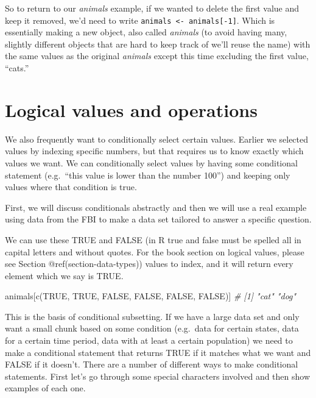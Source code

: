 \documentclass[
  a4paper,
]{krantz}
\makeatletter
\newenvironment{Shaded}{\begin{snugshade}}{\end{snugshade}}
\newcommand{\CommentTok}[1]{\textcolor[rgb]{0.56,0.35,0.01}{\textit{#1}}}
\newcommand{\ConstantTok}[1]{\textcolor[rgb]{0.00,0.00,0.00}{#1}}
\newcommand{\FunctionTok}[1]{\textcolor[rgb]{0.00,0.00,0.00}{#1}}
\newcommand{\NormalTok}[1]{#1}
\newenvironment{kframe}{%
\medskip{}
\setlength{\fboxsep}{.8em}
 \def\at@end@of@kframe{}%
 \ifinner\ifhmode%
  \def\at@end@of@kframe{\end{minipage}}%
  \begin{minipage}{\columnwidth}%
 \fi\fi%
 \def\FrameCommand##1{\hskip\@totalleftmargin \hskip-\fboxsep
 \colorbox{shadecolor}{##1}\hskip-\fboxsep
     \hskip-\linewidth \hskip-\@totalleftmargin \hskip\columnwidth}%
 \MakeFramed {\advance\hsize-\width
   \@totalleftmargin\z@ \linewidth\hsize
   \@setminipage}}%
 {\par\unskip\endMakeFramed%
 \at@end@of@kframe}
\renewenvironment{Shaded}{\begin{kframe}}{\end{kframe}}
\makeatother
\begin{document}
So to return to our \emph{animals} example, if we wanted to
delete the first value and keep it removed, we'd need to
write \texttt{animals\ \textless{}-\ animals{[}-1{]}}. Which
is essentially making a new object, also called
\emph{animals} (to avoid having many, slightly different
objects that are hard to keep track of we'll reuse the name)
with the same values as the original \emph{animals} except
this time excluding the first value, ``cats.''

\hypertarget{logical-values-and-operations}{%
\section{Logical values and
operations}\label{logical-values-and-operations}}

We also frequently want to conditionally select certain
values. Earlier we selected values by indexing specific
numbers, but that requires us to know exactly which values
we want. We can conditionally select values by having some
conditional statement (e.g.~``this value is lower than the
number 100'') and keeping only values where that condition
is true.

First, we will discuss conditionals abstractly and then we
will use a real example using data from the FBI to make a
data set tailored to answer a specific question.

We can use these TRUE and FALSE (in R true and false must be
spelled all in capital letters and without quotes. For the
book section on logical values, please see Section
@ref(section-data-types)) values to index, and it will
return every element which we say is TRUE.

\begin{Shaded}
\begin{Highlighting}[]
\NormalTok{animals[}\FunctionTok{c}\NormalTok{(}\ConstantTok{TRUE}\NormalTok{, }\ConstantTok{TRUE}\NormalTok{, }\ConstantTok{FALSE}\NormalTok{, }\ConstantTok{FALSE}\NormalTok{, }\ConstantTok{FALSE}\NormalTok{, }\ConstantTok{FALSE}\NormalTok{)]}
\CommentTok{\# [1] "cat" "dog"}
\end{Highlighting}
\end{Shaded}

This is the basis of conditional subsetting. If we have a
large data set and only want a small chunk based on some
condition (e.g.~data for certain states, data for a certain
time period, data with at least a certain population) we
need to make a conditional statement that returns TRUE if it
matches what we want and FALSE if it doesn't. There are a
number of different ways to make conditional statements.
First let's go through some special characters involved and
then show examples of each one.
\end{document}

